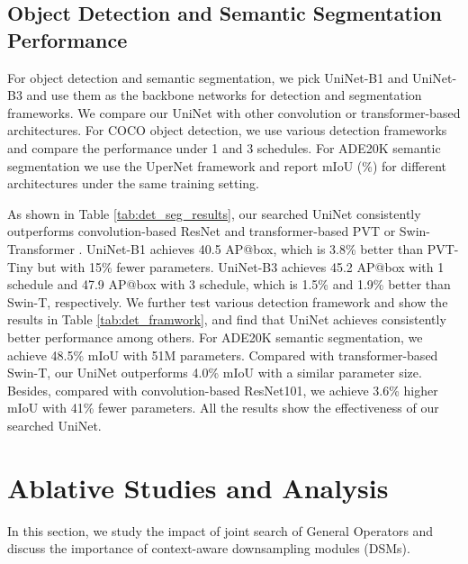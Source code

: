 \documentclass[runningheads]{llncs}
\begin{document}
\subsection{Object Detection and Semantic Segmentation Performance}
For object detection and semantic segmentation, we pick UniNet-B1 and UniNet-B3 and use them as the backbone networks for detection and segmentation frameworks. We compare our UniNet with other convolution or transformer-based architectures. For COCO object detection, we use various detection frameworks and compare the performance under 1 and 3 schedules. For ADE20K semantic segmentation we use the UperNet framework and report mIoU (\%) for different architectures under the same training setting.

As shown in Table \ref{tab:det_seg_results}, our searched UniNet consistently outperforms convolution-based ResNet \cite{resnet} and transformer-based PVT \cite{pvt} or Swin-Transformer \cite{swin}. UniNet-B1 achieves 40.5 AP@box, which is 3.8\% better than PVT-Tiny but with 15\% fewer parameters. UniNet-B3 achieves 45.2 AP@box with 1 schedule and 47.9 AP@box with 3 schedule, which is 1.5\% and 1.9\% better than Swin-T, respectively. We further test various detection framework and show the results in Table \ref{tab:det_framwork}, and find that UniNet achieves consistently better performance among others. 
For ADE20K semantic segmentation, we achieve 48.5\% mIoU with 51M parameters. Compared with transformer-based Swin-T, our UniNet outperforms 4.0\% mIoU with a similar parameter size. Besides, compared with convolution-based ResNet101, we achieve 3.6\% higher mIoU with 41\% fewer parameters. All the results show the effectiveness of our searched UniNet. 


\section{Ablative Studies and Analysis}
\label{ablation}

In this section, we study the impact of joint search of General Operators and discuss the importance of context-aware downsampling modules (DSMs).
\end{document}

